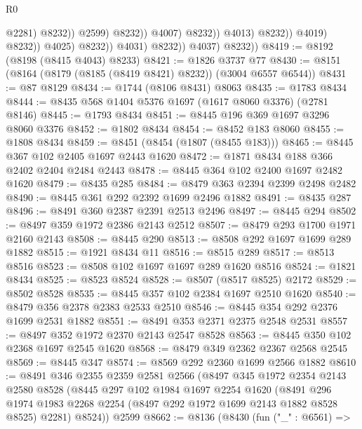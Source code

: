 \begin{lexlean}{R0}
\begin{coremodule}
                                                    @2281)
                                                  @8232))
                                              @2599)
                                            @8232))
                                        @4007)
                                      @8232))
                                  @4013)
                                @8232))
                            @4019)
                          @8232))
                      @4025)
                    @8232))
                @4031)
              @8232))
          @4037)
        @8232))
@8419 := @8192 (@8198 (@8415 @4043) @8233)
@8421 := @1826 @3737 @77
@8430 := @8151 (@8164 (@8179 (@8185 (@8419 @8421) @8232)) (@3004 @6557 @6544))
@8431 := @87 @8129
@8434 := @1744 (@8106 @8431) @8063
@8435 := @1783 @8434
@8444 := @8435 @568 @1404 @5376 @1697 (@1617 @8060 @3376) (@2781 @8146)
@8445 := @1793 @8434
@8451 := @8445 @196 @369 @1697 @3296 @8060 @3376
@8452 := @1802 @8434
@8454 := @8452 @183 @8060
@8455 := @1808 @8434
@8459 := @8451 (@8454 (@1807 (@8455 @183)))
@8465 := @8445 @367 @102 @2405 @1697 @2443 @1620
@8472 := @1871 @8434 @188 @366 @2402 @2404 @2484 @2443
@8478 := @8445 @364 @102 @2400 @1697 @2482 @1620
@8479 := @8435 @285
@8484 := @8479 @363 @2394 @2399 @2498 @2482
@8490 := @8445 @361 @292 @2392 @1699 @2496 @1882
@8491 := @8435 @287
@8496 := @8491 @360 @2387 @2391 @2513 @2496
@8497 := @8445 @294
@8502 := @8497 @359 @1972 @2386 @2143 @2512
@8507 := @8479 @293 @1700 @1971 @2160 @2143
@8508 := @8445 @290
@8513 := @8508 @292 @1697 @1699 @289 @1882
@8515 := @1921 @8434 @11
@8516 := @8515 @289
@8517 := @8513 @8516
@8523 := @8508 @102 @1697 @1697 @289 @1620 @8516
@8524 := @1821 @8434
@8525 := @8523 @8524
@8528 := @8507 (@8517 @8525) @2172
@8529 := @8502 @8528
@8535 := @8445 @357 @102 @2384 @1697 @2510 @1620
@8540 := @8479 @356 @2378 @2383 @2533 @2510
@8546 := @8445 @354 @292 @2376 @1699 @2531 @1882
@8551 := @8491 @353 @2371 @2375 @2548 @2531
@8557 := @8497 @352 @1972 @2370 @2143 @2547 @8528
@8563 := @8445 @350 @102 @2368 @1697 @2545 @1620
@8568 := @8479 @349 @2362 @2367 @2568 @2545
@8569 := @8445 @347
@8574 := @8569 @292 @2360 @1699 @2566 @1882
@8610 := @8491
    @346
    @2355
    @2359
    @2581
    @2566
    (@8497
      @345
      @1972
      @2354
      @2143
      @2580
      @8528
      (@8445
        @297
        @102
        @1984
        @1697
        @2254
        @1620
        (@8491 @296 @1974 @1983 @2268 @2254 (@8497 @292 @1972 @1699 @2143 @1882 @8528 @8525) @2281)
        @8524))
    @2599
@8662 := @8136
    (@8430
      (fun ("_" : @6561) =>

\end{coremodule}
\end{lexlean}
